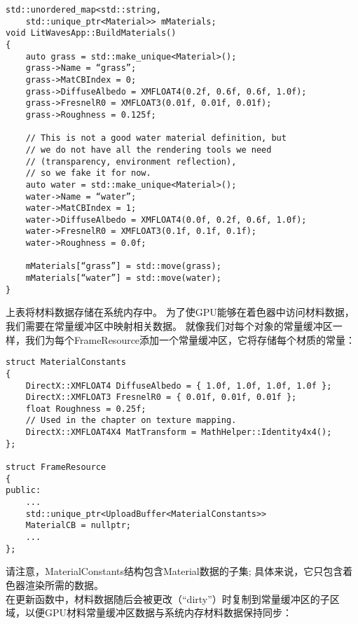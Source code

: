 \begin{lstlisting}
std::unordered_map<std::string, 
    std::unique_ptr<Material>> mMaterials;
void LitWavesApp::BuildMaterials()
{
    auto grass = std::make_unique<Material>();
    grass->Name = “grass”;
    grass->MatCBIndex = 0;
    grass->DiffuseAlbedo = XMFLOAT4(0.2f, 0.6f, 0.6f, 1.0f);
    grass->FresnelR0 = XMFLOAT3(0.01f, 0.01f, 0.01f);
    grass->Roughness = 0.125f;
    
    // This is not a good water material definition, but
    // we do not have all the rendering tools we need 
    // (transparency, environment reflection), 
    // so we fake it for now.
    auto water = std::make_unique<Material>();
    water->Name = “water”;
    water->MatCBIndex = 1;
    water->DiffuseAlbedo = XMFLOAT4(0.0f, 0.2f, 0.6f, 1.0f);
    water->FresnelR0 = XMFLOAT3(0.1f, 0.1f, 0.1f);
    water->Roughness = 0.0f;

    mMaterials[“grass”] = std::move(grass);
    mMaterials[“water”] = std::move(water);
}
\end{lstlisting}

\begin{flushleft}
上表将材料数据存储在系统内存中。 为了使GPU能够在着色器中访问材料数据，我们需要在常量缓冲区中映射相关数据。 就像我们对每个对象的常量缓冲区一样，我们为每个FrameResource添加一个常量缓冲区，它将存储每个材质的常量：\\
\end{flushleft}

\begin{lstlisting}
struct MaterialConstants
{
    DirectX::XMFLOAT4 DiffuseAlbedo = { 1.0f, 1.0f, 1.0f, 1.0f };
    DirectX::XMFLOAT3 FresnelR0 = { 0.01f, 0.01f, 0.01f };
    float Roughness = 0.25f;
    // Used in the chapter on texture mapping.
    DirectX::XMFLOAT4X4 MatTransform = MathHelper::Identity4x4();
};

struct FrameResource
{
public:
    ...
    std::unique_ptr<UploadBuffer<MaterialConstants>>
    MaterialCB = nullptr;
    ...
};
\end{lstlisting}

\begin{flushleft}
请注意，MaterialConstants结构包含Material数据的子集; 具体来说，它只包含着色器渲染所需的数据。\\
在更新函数中，材料数据随后会被更改（“dirty”）时复制到常量缓冲区的子区域，以便GPU材料常量缓冲区数据与系统内存材料数据保持同步：\\
\end{flushleft}

